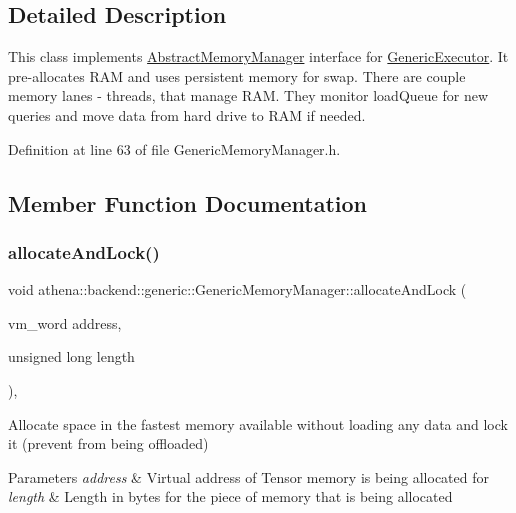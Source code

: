 \subsection{Detailed Description}
This class implements \mbox{\hyperlink{classathena_1_1backend_1_1_abstract_memory_manager}{Abstract\+Memory\+Manager}} interface for \mbox{\hyperlink{classathena_1_1backend_1_1generic_1_1_generic_executor}{Generic\+Executor}}. It pre-\/allocates R\+AM and uses persistent memory for swap. There are couple memory lanes -\/ threads, that manage R\+AM. They monitor load\+Queue for new queries and move data from hard drive to R\+AM if needed. 

Definition at line 63 of file Generic\+Memory\+Manager.\+h.



\subsection{Member Function Documentation}
\mbox{\label{classathena_1_1backend_1_1generic_1_1_generic_memory_manager_abe837ac5e3bb60c9bc24836788cae679}} 
\subsubsection{\texorpdfstring{allocate\+And\+Lock()}{allocateAndLock()}\hspace{0.1cm}{\footnotesize\ttfamily [1/4]}}
{\footnotesize\ttfamily void athena\+::backend\+::generic\+::\+Generic\+Memory\+Manager\+::allocate\+And\+Lock (\begin{DoxyParamCaption}\item[{vm\+\_\+word}]{address,  }\item[{unsigned long}]{length }\end{DoxyParamCaption})\hspace{0.3cm}{\ttfamily [override]}, {\ttfamily [virtual]}}

Allocate space in the fastest memory available without loading any data and lock it (prevent from being offloaded) 
\begin{DoxyParams}{Parameters}
{\em address} & Virtual address of Tensor memory is being allocated for \\
\hline
{\em length} & Length in bytes for the piece of memory that is being allocated \\
\hline
\end{DoxyParams}


